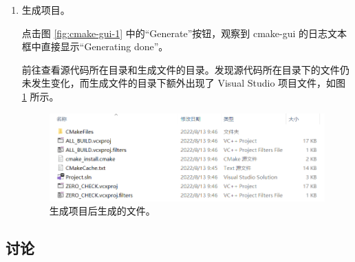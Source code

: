 \begin{enumerate}
	\item 生成项目。

	点击图 \ref{fig:cmake-gui-1} 中的“Generate”按钮，观察到 cmake-gui 的日志文本框中直接显示“Generating done”。

	前往查看源代码所在目录和生成文件的目录。发现源代码所在目录下的文件仍未发生变化，而生成文件的目录下额外出现了 Visual Studio 项目文件，如图 \ref{fig:empty-cmake-6} 所示。

	\begin{figure}[H]
		\centering
		\includegraphics[width=0.9\linewidth]{assets/empty-cmake-6}
		\caption{生成项目后生成的文件。}
		\label{fig:empty-cmake-6}
	\end{figure}
\end{enumerate}

\subsection*{讨论}

